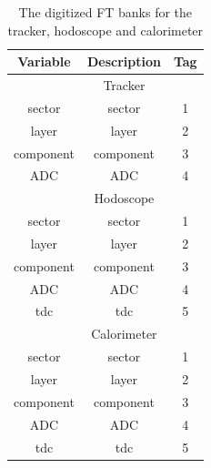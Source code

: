 \begin{table}[h]
	\begin{center}
		\begin{tabular}{| c | c | c |}
			\hline \hline
			Variable         & Description  & Tag  \\
			\hline
		         & Tracker  &   \\
			\hline
                       sector  &                                     sector   &    1   \\
                        layer  &                                      layer   &    2   \\
                    component  &                                  component   &    3   \\
                          ADC  &                                         ADC  &    4   \\
			\hline
		         & Hodoscope  &   \\
			\hline
                  sector  &                                     sector   &    1   \\
                        layer  &                                      layer   &    2   \\
                    component  &                                  component   &    3   \\
                          ADC  &                                         ADC  &    4   \\
                          tdc  &                                         tdc  &    5   \\
			\hline
 		         & Calorimeter  &   \\
			\hline
				        sector  &                                     sector   &    1   \\
				   	      layer  &                                      layer   &    2   \\
				        component  &                                  component   &    3   \\
						        ADC  &                                         ADC  &    4   \\
						        tdc  &                                         tdc  &    5   \\
			\hline \hline
		\end{tabular}
	\end{center}
	\caption{The digitized FT banks for the tracker, hodoscope and calorimeter}\label{tab:ftBank}
\end{table}

